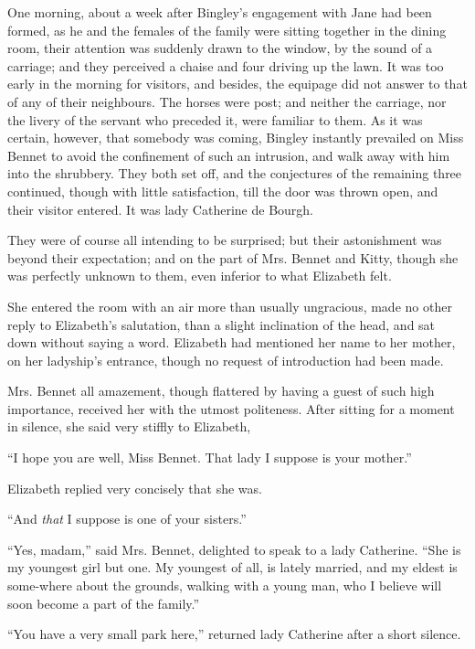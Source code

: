 
One morning, about a week after Bingley’s engagement
with Jane had been formed, as he and the females of the
family were sitting together in the dining room, their
attention was suddenly drawn to the window, by the
sound of a carriage; and they perceived a chaise and four
driving up the lawn. It was too early in the morning for
visitors, and besides, the equipage did not answer to that
of any of their neighbours. The horses were post; and
neither the carriage, nor the livery of the servant who
preceded it, were familiar to them. As it was certain,
however, that somebody was coming, Bingley instantly
prevailed on Miss Bennet to avoid the confinement of
such an intrusion, and walk away with him into the
shrubbery. They both set off, and the conjectures of the
remaining three continued, though with little satisfaction,
till the door was thrown open, and their visitor entered.
It was lady Catherine de Bourgh.

They were of course all intending to be surprised; but
their astonishment was beyond their expectation; and on
the part of Mrs. Bennet and Kitty, though she was perfectly
unknown to them, even inferior to what Elizabeth felt.

She entered the room with an air more than usually
ungracious, made no other reply to Elizabeth’s salutation,
than a slight inclination of the head, and sat down without
saying a word. Elizabeth had mentioned her name to
her mother, on her ladyship’s entrance, though no request
of introduction had been made.

Mrs. Bennet all amazement, though flattered by having
a guest of such high importance, received her with the
utmost politeness. After sitting for a moment in silence,
she said very stiffly to Elizabeth,

“I hope you are well, Miss Bennet. That lady I suppose
is your mother.”

Elizabeth replied very concisely that she was.

“And \textit{that} I suppose is one of your sisters.”

“Yes, madam,” said Mrs. Bennet, delighted to speak
to a lady Catherine. “She is my youngest girl but one.
My youngest of all, is lately married, and my eldest is
some-where about the grounds, walking with a young man,
who I believe will soon become a part of the family.”

“You have a very small park here,” returned lady
Catherine after a short silence.

